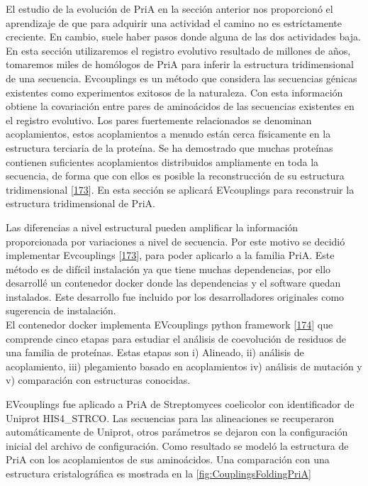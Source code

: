 \documentclass[12pt,twoside]{reedthesis}
\begin{document}
  El estudio de la evolución de PriA en la sección anterior nos
  proporcionó el aprendizaje de que para adquirir una actividad el camino
  no es estrictamente creciente. En cambio, suele haber pasos donde alguna
  de las dos actividades baja. En esta sección utilizaremos el registro
  evolutivo resultado de millones de años, tomaremos miles de homólogos de
  PriA para inferir la estructura tridimensional de una secuencia.
  Evcouplings es un método que considera las secuencias génicas existentes
  como experimentos exitosos de la naturaleza. Con esta información
  obtiene la covariación entre pares de aminoácidos de las secuencias
  existentes en el registro evolutivo. Los pares fuertemente relacionados
  se denominan acoplamientos, estos acoplamientos a menudo están cerca
  físicamente en la estructura terciaria de la proteína. Se ha demostrado
  que muchas proteínas contienen suficientes acoplamientos distribuidos
  ampliamente en toda la secuencia, de forma que con ellos es posible la
  reconstrucción de su estructura tridimensional
  {[}\protect\hyperlink{ref-marks_protein_2011}{173}{]}. En esta sección
  se aplicará EVcouplings para reconstruir la estructura tridimensional de
  PriA.
  
  Las diferencias a nivel estructural pueden amplificar la información
  proporcionada por variaciones a nivel de secuencia. Por este motivo se
  decidió implementar Evcouplings
  {[}\protect\hyperlink{ref-marks_protein_2011}{173}{]}, para poder
  aplicarlo a la familia PriA. Este método es de difícil instalación ya
  que tiene muchas dependencias, por ello desarrollé un contenedor docker
  donde las dependencias y el software quedan instalados. Este desarrollo
  fue incluido por los desarrolladores originales como sugerencia de
  instalación.\\
  El contenedor docker implementa EVcouplings python framework
  {[}\protect\hyperlink{ref-hopf_evcouplings_2019}{174}{]} que comprende
  cinco etapas para estudiar el análisis de coevolución de residuos de una
  familia de proteínas. Estas etapas son i) Alineado, ii) análisis de
  acoplamiento, iii) plegamiento basado en acoplamientos iv) análisis de
  mutación y v) comparación con estructuras conocidas.
  
  EVcouplings fue aplicado a PriA de Streptomyces coelicolor con
  identificador de Uniprot HIS4\_STRCO. Las secuencias para las
  alineaciones se recuperaron automáticamente de Uniprot, otros parámetros
  se dejaron con la configuración inicial del archivo de configuración.
  Como resultado se modeló la estructura de PriA con los acoplamientos de
  sus aminoácidos. Una comparación con una estructura cristalográfica es
  mostrada en la \autoref{fig:CouplingsFoldingPriA}
  
\end{document}
